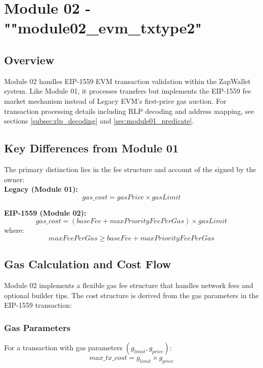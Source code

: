 \newpage
\section{Module 02 - {\ttfamily ""module02\_evm\_txtype2"}}
\label{sec:module02_predicate}


\subsection{Overview}
Module 02 handles EIP-1559 EVM transaction validation within the ZapWallet system. Like Module 01, it processes 
transfers but implements the EIP-1559 fee market mechanism instead of Legacy EVM's first-price gas auction. For transaction processing
details including RLP decoding and address mapping, see sections \ref{subsec:rlp_decoding} and \ref{sec:module01_predicate}.\\

\subsection{Key Differences from Module 01}
The primary distinction lies in the fee structure and account of the  signed by the owner:\\

\textbf{Legacy (Module 01):}
\[ gas\_cost = gasPrice \times gasLimit \]

\textbf{EIP-1559 (Module 02):}
\[ gas\_cost = (baseFee + maxPriorityFeePerGas) \times gasLimit \]
where:
\[ maxFeePerGas \geq baseFee + maxPriorityFeePerGas \]




\subsection{Gas Calculation and Cost Flow}
\label{subsec:gas_costing:sec:module02_predicate}
Module 02 implements a flexible gas fee structure that handles network fees and optional builder tips. The cost structure is derived from the
gas parameters in the EIP-1559 transaction:\\

\subsubsection{Gas Parameters}
For a transaction with gas parameters $(g_{limit}, g_{price})$:
\[ max\_tx\_cost = g_{limit} \times g_{price} \]

